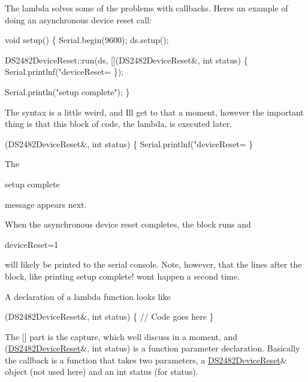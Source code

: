 The lambda solves some of the problems with callbacks. Here\textquotesingle{}s an example of doing an asynchronous device reset call\+:


\begin{DoxyCode}
void setup() \{
    Serial.begin(9600);
    ds.setup();

    DS2482DeviceReset::run(ds, [](DS2482DeviceReset&, int status) \{
        Serial.printlnf("deviceReset=%
    \});

    Serial.println("setup complete");
\}
\end{DoxyCode}


The syntax is a little weird, and I\textquotesingle{}ll get to that a moment, however the important thing is that this block of code, the lambda, is executed later.


\begin{DoxyCode}
[](DS2482DeviceReset&, int status) \{
    Serial.printlnf("deviceReset=%
\}
\end{DoxyCode}


The


\begin{DoxyCode}
setup complete
\end{DoxyCode}


message appears next.

When the asynchronous device reset completes, the block runs and


\begin{DoxyCode}
deviceReset=1
\end{DoxyCode}


will likely be printed to the serial console. Note, however, that the lines after the block, like printing setup complete! won\textquotesingle{}t happen a second time.

A declaration of a lambda function looks like


\begin{DoxyCode}
[](DS2482DeviceReset&, int status) \{
    // Code goes here
\}
\end{DoxyCode}


The {\ttfamily \mbox{[}\mbox{]}} part is the capture, which we\textquotesingle{}ll discuss in a moment, and {\ttfamily (\mbox{\hyperlink{class_d_s2482_device_reset}{D\+S2482\+Device\+Reset}}\&, int status)} is a function parameter declaration. Basically the callback is a function that takes two parameters, a {\ttfamily \mbox{\hyperlink{class_d_s2482_device_reset}{D\+S2482\+Device\+Reset}}\&} object (not used here) and an {\ttfamily int status} (for status).

